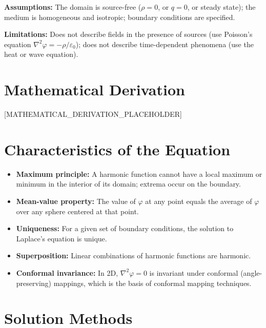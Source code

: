 \documentclass[11pt,openright]{book}
\begin{document}
\textbf{Assumptions:} The domain is source-free ($\rho = 0$, or $q = 0$, or steady state); the medium is homogeneous and isotropic; boundary conditions are specified.


\textbf{Limitations:} Does not describe fields in the presence of sources (use Poisson's equation $\nabla^{2}\varphi = -\rho/\varepsilon_{0}$); does not describe time-dependent phenomena (use the heat or wave equation).


\section*{Mathematical Derivation}

[MATHEMATICAL_DERIVATION_PLACEHOLDER]

\section*{Characteristics of the Equation}

\begin{itemize}
  \item \textbf{Maximum principle:} A harmonic function cannot have a local maximum or minimum in the interior of its domain; extrema occur on the boundary.
  \item \textbf{Mean-value property:} The value of $\varphi$ at any point equals the average of $\varphi$ over any sphere centered at that point.
  \item \textbf{Uniqueness:} For a given set of boundary conditions, the solution to Laplace's equation is unique.
  \item \textbf{Superposition:} Linear combinations of harmonic functions are harmonic.
  \item \textbf{Conformal invariance:} In 2D, $\nabla^{2}\varphi = 0$ is invariant under conformal (angle-preserving) mappings, which is the basis of conformal mapping techniques.
\end{itemize}
\section*{Solution Methods}
\end{document}
